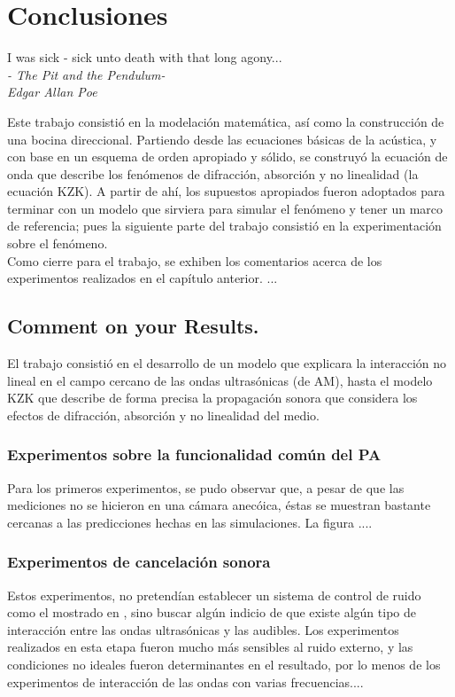 \chapter{Conclusiones}
\begin{flushright} 
I was sick - sick unto death with that long agony...\\
\emph{- The Pit and the Pendulum-}\\
\emph{Edgar Allan Poe}
\end{flushright}

Este trabajo consistió en la modelación matemática, así como la construcción de una bocina direccional. Partiendo desde las ecuaciones básicas de la acústica, y con base en un esquema de orden apropiado y sólido, se construyó la ecuación de onda que describe los fenómenos de difracción, absorción y no linealidad (la ecuación KZK). A partir de ahí, los supuestos apropiados fueron adoptados para terminar con un modelo que sirviera para simular el fenómeno y tener un marco de referencia; pues la siguiente parte del trabajo consistió en la experimentación sobre el fenómeno.\medskip\\
Como cierre para el trabajo, se exhiben los comentarios acerca de los experimentos realizados en el capítulo anterior. ...
\section{Comment on your Results.} 
El trabajo consistió en el desarrollo de un modelo que explicara la interacción no lineal en el campo cercano de las ondas ultrasónicas (de AM), hasta el modelo KZK que describe de forma precisa la propagación sonora que considera los efectos de difracción, absorción y no linealidad del medio.
\subsection{Experimentos sobre la funcionalidad común del PA}
Para los primeros experimentos, se pudo observar que, a pesar de que las mediciones no se hicieron en una cámara anecóica, éstas se muestran bastante cercanas a las predicciones hechas en las simulaciones. La figura ....
\subsection{Experimentos de cancelación sonora}
Estos experimentos, no pretendían establecer un sistema de control de ruido como el mostrado en \cite{feasibility}, sino buscar algún indicio de que existe algún tipo de interacción entre las ondas ultrasónicas y las audibles. Los experimentos realizados en esta etapa fueron mucho más sensibles al ruido externo, y las condiciones no ideales fueron determinantes en el resultado, por lo menos de los experimentos de interacción de las ondas con varias frecuencias....
